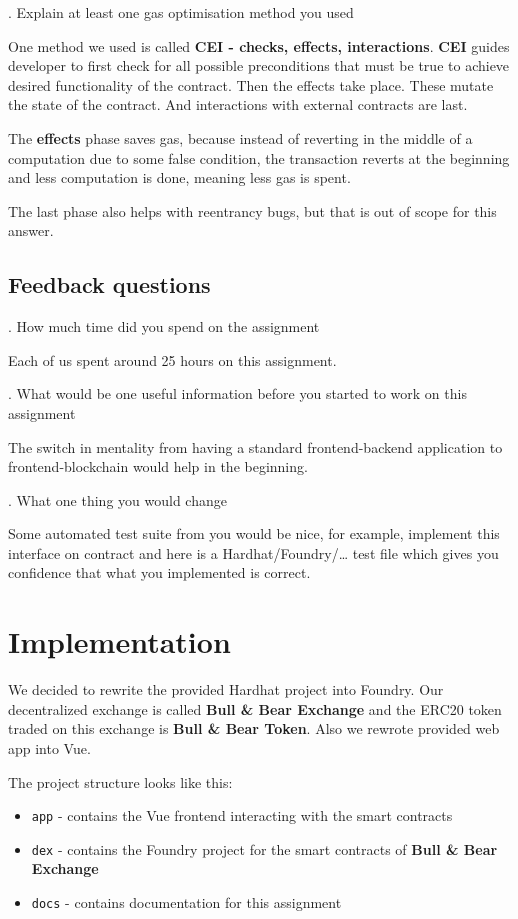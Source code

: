 \documentclass[11pt,a4paper]{article}
\newcounter{question}
\newcommand\Que[1]{
   \leavevmode\par
   \stepcounter{question}
   \noindent
   \thequestion. #1\par}
\newcommand\Ans[2][]{
    \leavevmode\par\noindent
   {\leftskip37pt
    \textbf{#1}#2\par}}
\begin{document}
\Que{Explain at least one gas optimisation method you used}
\Ans{
One method we used is called \textbf{CEI - checks, effects, interactions}\cite{securityConsiderationsCEI}.
\textbf{CEI} guides developer to first check for all possible preconditions
that must be true to achieve desired functionality of the contract. Then
the effects take place. These mutate the state of the contract. And interactions
with external contracts are last.

The \textbf{effects} phase saves gas, because instead of reverting in the middle
of a computation due to some false condition, the transaction reverts at the
beginning and less computation is done, meaning less gas is spent.

The last phase also helps with reentrancy bugs, but that is out of scope for
this answer.
}

\subsection*{Feedback questions}

\Que{How much time did you spend on the assignment}
\Ans{Each of us spent around 25 hours on this assignment.}

\Que{What would be one useful information before you started to work on this assignment}
\Ans{The switch in mentality from having a standard frontend-backend application to
frontend-blockchain would help in the beginning.}

\Que{What one thing you would change}
\Ans{Some automated test suite from you would be nice, for example, implement
this interface on contract and here is a Hardhat/Foundry/\ldots\; test file which
gives you confidence that what you implemented is correct.}

\section{Implementation}

We decided to rewrite the provided Hardhat project into Foundry\cite{foundryBook}.
Our decentralized exchange is called \textbf{Bull \& Bear Exchange} and the ERC20
token traded on this exchange is \textbf{Bull \& Bear Token}. Also we rewrote
provided web app into Vue\cite{vuejs}.

The project structure looks like this:

\begin{itemize}
    \item \texttt{app} - contains the Vue frontend interacting with the smart contracts
    \item \texttt{dex} - contains the Foundry project for the smart contracts of \textbf{Bull \& Bear Exchange}
    \item \texttt{docs} - contains documentation for this assignment
\end{itemize}
\end{document}
